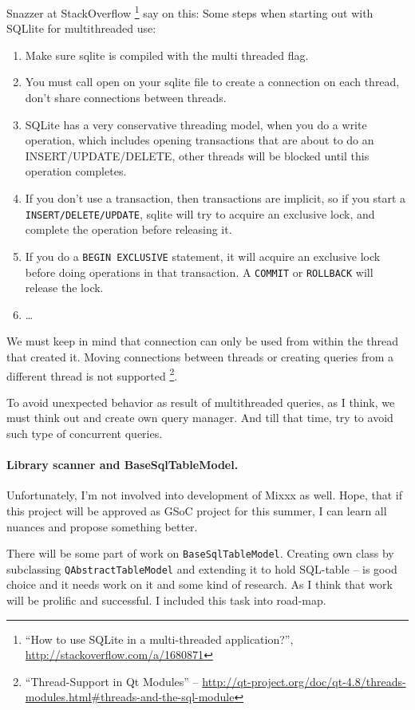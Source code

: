 \documentclass[a4paper,12pt]{scrartcl}
\begin{document}
Snazzer at StackOverflow%
\footnote{``How to use SQLite in a multi-threaded application?'', \url{http://stackoverflow.com/a/1680871}}
say on this:
Some steps when starting out with SQLlite for multithreaded use:
\begin{enumerate}
 \item Make sure sqlite is compiled with the multi threaded flag.
 \item You must call open on your sqlite file to create a connection on each thread, don't share connections 
    between threads.
 \item SQLite has a very conservative threading model, when you do a write operation, which includes opening 
    transactions that are about to do an INSERT/UPDATE/DELETE, other threads will be blocked until this 
    operation completes.
 \item If you don't use a transaction, then transactions are implicit, so if you start a 
    \texttt{INSERT/DELETE/UPDATE}, sqlite will try to acquire an exclusive lock, and complete the operation 
    before releasing it.
 \item If you do a \texttt{BEGIN EXCLUSIVE} statement, it will acquire an exclusive lock before doing operations 
    in that transaction. A \texttt{COMMIT} or \texttt{ROLLBACK} will release the lock.
 \item \ldots
\end{enumerate}

We must keep in mind that connection can only be used from within the thread that created it. Moving connections 
between threads or creating queries from a different thread is not supported%
\footnote{``Thread-Support in Qt Modules'' --
\url{http://qt-project.org/doc/qt-4.8/threads-modules.html\#threads-and-the-sql-module}}.

To avoid unexpected behavior as result of multithreaded queries, as I think, we must think out and create own 
query manager. And till that time, try to avoid such type of concurrent queries.

\paragraph{Library scanner and BaseSqlTableModel.} Unfortunately, I'm not involved into development of 
Mixxx as well. Hope, that if this project will be approved as GSoC project for this summer, I can learn all nuances
and propose something better.

There will be some part of work on \texttt{BaseSqlTableModel}. Creating own class by subclassing \texttt{QAbstractTableModel}
and extending it to hold SQL-table -- is good choice and it needs work on it and some kind of research. As I think that work 
will be prolific and successful. I included this task into road-map.
\end{document}
